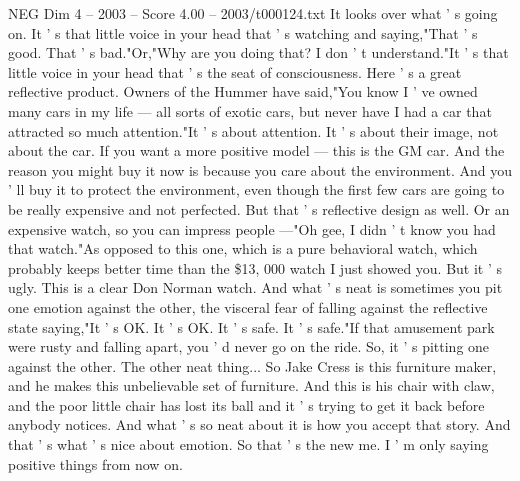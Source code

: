 \begin{textsample}{NEG Dim 4 – 2003 – Score 4.00 – 2003/t000124.txt}
It looks over what ' s going on.
It ' s that little voice in your head that ' s watching and saying,"That ' s good.
That ' s bad."Or,"Why are you doing that?
I don ' t understand."It ' s that little voice in your head that ' s the seat of consciousness.
Here ' s a great reflective product.
Owners of the Hummer have said,"You know I ' ve owned many cars in my life — all sorts of exotic cars, but never have I had a car that attracted so much attention."It ' s about attention.
It ' s about their image, not about the car.
If you want a more positive model — this is the GM car.
And the reason you might buy it now is because you care about the environment.
And you ' ll buy it to protect the environment, even though the first few cars are going to be really expensive and not perfected.
But that ' s reflective design as well.
Or an expensive watch, so you can impress people —"Oh gee, I didn ' t know you had that watch."As opposed to this one, which is a pure behavioral watch, which probably keeps better time than the \$13, 000 watch I just showed you.
But it ' s ugly.
This is a clear Don Norman watch.
And what ' s neat is sometimes you pit one emotion against the other, the visceral fear of falling against the reflective state saying,"It ' s OK.
It ' s OK.
It ' s safe.
It ' s safe."If that amusement park were rusty and falling apart, you ' d never go on the ride.
So, it ' s pitting one against the other.
The other neat thing...
So Jake Cress is this furniture maker, and he makes this unbelievable set of furniture.
And this is his chair with claw, and the poor little chair has lost its ball and it ' s trying to get it back before anybody notices.
And what ' s so neat about it is how you accept that story.
And that ' s what ' s nice about emotion.
So that ' s the new me.
I ' m only saying positive things from now on.

\end{textsample}
